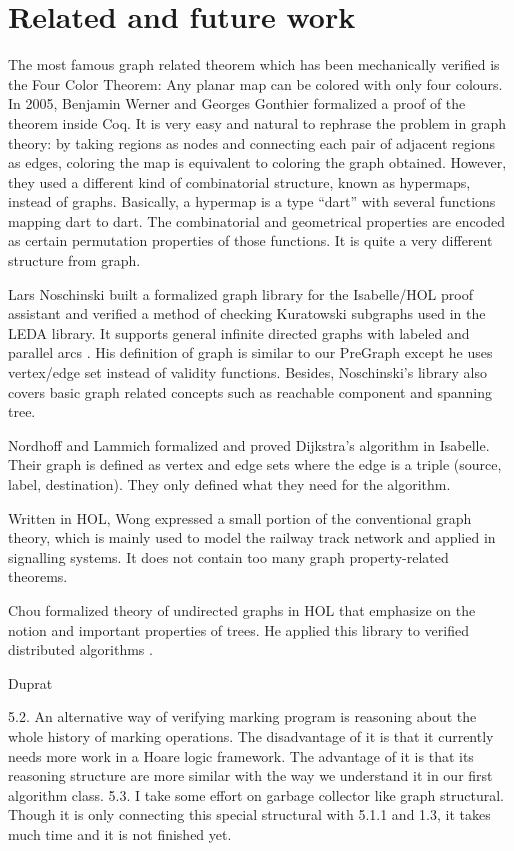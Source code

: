 \section{Related and future work}

The most famous graph related theorem which has been mechanically
verified is the Four Color Theorem: Any planar map can be colored with
only four colours. In 2005, Benjamin Werner and Georges Gonthier
formalized a proof of the theorem \cite{gonthier2005computer} inside
Coq. It is very easy and natural to rephrase the problem in graph
theory: by taking regions as nodes and connecting each pair of
adjacent regions as edges, coloring the map is equivalent to coloring
the graph obtained. However, they used a different kind of
combinatorial structure, known as hypermaps, instead of
graphs. Basically, a hypermap is a type ``dart'' with several
functions mapping dart to dart. The combinatorial and geometrical
properties are encoded as certain permutation properties of those
functions. It is quite a very different structure from graph.

Lars Noschinski built a formalized graph library for the Isabelle/HOL
proof assistant and verified a method of checking Kuratowski subgraphs
used in the LEDA library. It supports general infinite directed graphs
with labeled and parallel arcs \cite{Noschinski2015}. His definition
of graph is similar to our PreGraph except he uses vertex/edge set
instead of validity functions. Besides, Noschinski's library also
covers basic graph related concepts such as reachable component and
spanning tree.

Nordhoff and Lammich \cite{Dijkstra_Shortest_Path-AFP} formalized and
proved Dijkstra's algorithm in Isabelle. Their graph is defined as
vertex and edge sets where the edge is a triple (source, label,
destination). They only defined what they need for the algorithm.

Written in HOL, Wong \cite{wong1991} expressed a small portion of the
conventional graph theory, which is mainly used to model the railway
track network and applied in signalling systems. It does not contain
too many graph property-related theorems.

Chou \cite{chou1994formal} formalized theory of undirected graphs in
HOL that emphasize on the notion and important properties of trees. He
applied this library to verified distributed algorithms
\cite{chou1995mechanical}.

Duprat \cite{duprat2001coq} 



5.2. An alternative way of verifying marking program is reasoning about the whole history of marking operations. The disadvantage of it is that it currently needs more work in a Hoare logic framework. The advantage of it is that its reasoning structure are more similar with the way we understand it in our first algorithm class.
5.3. I take some effort on garbage collector like graph structural. Though it is only connecting this special structural with 5.1.1 and 1.3, it takes much time and it is not finished yet.
